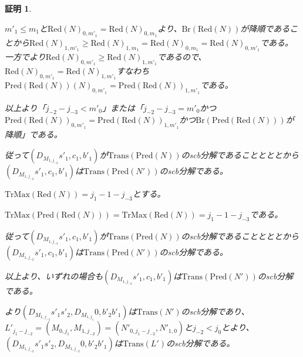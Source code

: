 \documentclass[dvipdfmx,uplatex]{jsarticle}
\theoremstyle{customnonumberbreakfortheorem}
\theoremstyle{customnonumberbreakforproof}
\newtheorem{hideableproof}{証明}
\begin{document}
\begin{hideableproof}
\begin{indented}
\begin{indented}
\begin{indented}
				\item \(m'_1 \leq m_1\)と\(\textrm{Red}(N)_{0,m'_1} = \textrm{Red}(N)_{0,m_1}\)より、\(\textrm{Br}(\textrm{Red}(N))\)が降順であることから\(\textrm{Red}(N)_{1,m'_1} \geq \textrm{Red}(N)_{1,m_1} = \textrm{Red}(N)_{0,m_1} = \textrm{Red}(N)_{0,m'_1}\)である。一方でより\(\textrm{Red}(N)_{0,m'_1} \geq \textrm{Red}(N)_{1,m'_1}\)であるので、\(\textrm{Red}(N)_{0,m'_1} = \textrm{Red}(N)_{1,m'_1}\)すなわち\(\textrm{Pred}(\textrm{Red}(N))(N)_{0,m'_1} = \textrm{Pred}(\textrm{Red}(N))_{1,m'_1}\)である。
			\end{indented}
			\item 以上より「\(j_{-2}-j_{-3} < m'_0\)」または「\(j_{-2}-j_{-3} = m'_0\)かつ\(\textrm{Pred}(\textrm{Red}(N))_{0,m'_1} = \textrm{Pred}(\textrm{Red}(N))_{1,m'_1}\)かつ\(\textrm{Br}(\textrm{Pred}(\textrm{Red}(N)))\)が降順」である。
			\item 従って\((D_{M_{1,j_{-3}}} s'_1,c_1,b'_1)\)が\(\textrm{Trans}(\textrm{Pred}(N))\)のscb分解であることとととから\((D_{M_{1,j_{-2}}} s'_1,c_1,b'_1)\)は\(\textrm{Trans}(\textrm{Pred}(N'))\)のscb分解である。
		\end{indented}
		\item
		\item \(\textrm{TrMax}(\textrm{Red}(N)) = j_1-1-j_{-3}\)とする。
		\begin{indented}
			\item \(\textrm{TrMax}(\textrm{Pred}(\textrm{Red}(N))) = \textrm{TrMax}(\textrm{Red}(N)) = j_1-1-j_{-3}\)である。
			\item 従って\((D_{M_{1,j_{-3}}} s'_1,c_1,b'_1)\)が\(\textrm{Trans}(\textrm{Pred}(N))\)のscb分解であることとととから\((D_{M_{1,j_{-2}}} s'_1,c_1,b'_1)\)は\(\textrm{Trans}(\textrm{Pred}(N'))\)のscb分解である。
		\end{indented}
		\item 以上より、いずれの場合も\((D_{M_{1,j_{-2}}} s'_1,c_1,b'_1)\)は\(\textrm{Trans}(\textrm{Pred}(N'))\)のscb分解である。
		\item {}より\((D_{M_{1,j_{-2}}} s'_1 s'_2,D_{M_{1,j_1}} 0,b'_2 b'_1)\)は\(\textrm{Trans}(N')\)のscb分解であり、\(L'_{j_1-j_{-2}} = (M_{0,j_1},M_{1,j_{-2}}) = (N'_{0,j_1-j_{-2}},N'_{1,0})\)と\(j_{-2} < j_0\)とより、\((D_{M_{1,j_{-2}}} s'_1 s'_2,D_{M_{1,j_{-2}}} 0,b'_2 b'_1)\)は\(\textrm{Trans}(L')\)のscb分解である。

\end{indented}
\end{hideableproof}
\end{document}
